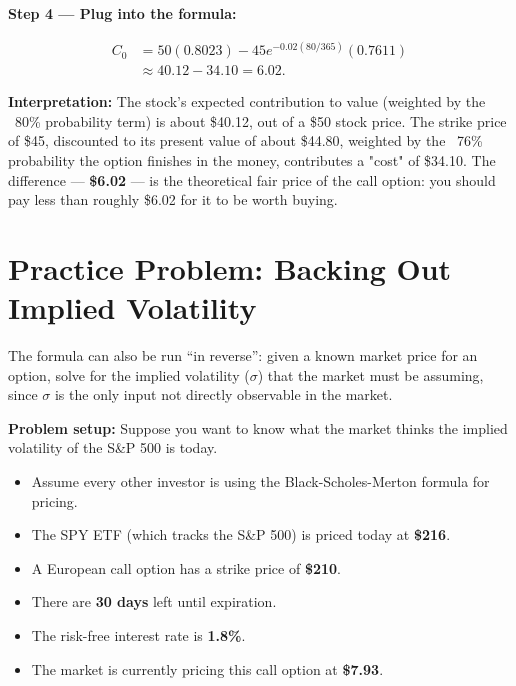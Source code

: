 \documentclass[12pt,openany]{book}
\theoremstyle{definition}
\theoremstyle{remark}
\begin{document}
\textbf{Step 4 --- Plug into the formula:}

\[
\begin{aligned}
C_0
&=50(0.8023)-45e^{-0.02(80/365)}(0.7611)\\
&\approx40.12-34.10
=\boxed{6.02}.
\end{aligned}
\]

\textbf{Interpretation:} The stock's expected contribution to value (weighted by the ~80\% probability term) is about \$40.12, out of a \$50 stock price. The strike price of \$45, discounted to its present value of about \$44.80, weighted by the ~76\% probability the option finishes in the money, contributes a "cost" of \$34.10. The difference --- \textbf{\$6.02} --- is the theoretical fair price of the call option: you should pay less than roughly \$6.02 for it to be worth buying.

\section{Practice Problem: Backing Out Implied Volatility}

The formula can also be run ``in reverse'': given a known market price for an option, solve for the implied volatility (\(\sigma\)) that the market must be assuming, since \(\sigma\) is the only input not directly observable in the market.

\textbf{Problem setup:} Suppose you want to know what the market thinks the implied volatility of the S\&P 500 is today.

\begin{itemize}
\item Assume every other investor is using the Black-Scholes-Merton formula for pricing.


\item The SPY ETF (which tracks the S\&P 500) is priced today at \textbf{\$216}.


\item A European call option has a strike price of \textbf{\$210}.


\item There are \textbf{30 days} left until expiration.


\item The risk-free interest rate is \textbf{1.8\%}.


\item The market is currently pricing this call option at \textbf{\$7.93}.


\end{itemize}
\end{document}
